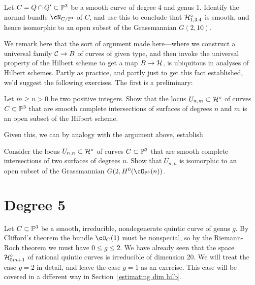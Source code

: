 \begin{exercise}
Let $C = Q \cap Q' \subset \PP^3$ be a smooth curve of degree 4 and genus 1. Identify the normal bundle $\cN_{C/\PP^3}$ of $C$, and use this to conclude that $\cH^\circ_{1,3,4}$ is smooth, and hence isomorphic to an open subset of the Grassmannian $G(2,10)$.
\end{exercise}

We remark here that the sort of argument made here---where we construct a universal family $\cC \to B$ of curves of given type, and then invoke the universal property of the Hilbert scheme to get a map $B \to \cH$, is ubiquitous in analyses of Hilbert schemes. Partly as practice, and partly just to get this fact established, we'd suggest the following exercises. The first is a preliminary:

\begin{exercise}
Let $m \geq n >0$ be two positive integers. Show that the locus $U_{n,m} \subset \cH^\circ$ of curves $C \subset \PP^3$ that are smooth complete intersections of surfaces of degrees $n$ and $m$ is an open subset of the Hilbert scheme.
\end{exercise}

Given this, we can by analogy with the argument above, establish

\begin{exercise}\label{first complete intersection exercise}
Consider  the locus $U_{n,n} \subset \cH^\circ$ of curves $C \subset \PP^3$ that are smooth complete intersections of two surfaces of degrees $n$. Show that $U_{n,n}$ 
is isomorphic to an open subset of the Grassmannian $G(2, H^0(\cO_{\PP^3}(n))$.
\end{exercise}

%
%

\section{Degree 5}

Let $C \subset \PP^3$ be a smooth, irreducible, nondegenerate quintic curve of genus $g$. By Clifford's theorem the bundle $\cO_C(1)$ must be nonspecial, so  by the Riemann-Roch theorem we must have $0\leq g \leq 2$. We have already seen that the space $\cH^\circ_{5m+1}$ of rational quintic curves is irreducible of dimension 20. We will treat the case $g=2$ in detail, and leave the case $g=1$ as an exercise. This case will be covered in a different way in Section~\ref{estimating dim hilb}.

